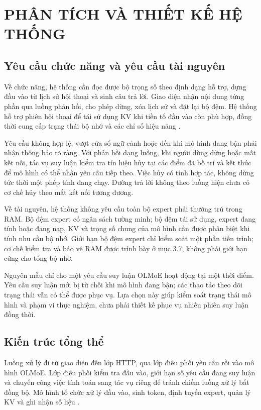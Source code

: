 \chapter{PHÂN TÍCH VÀ THIẾT KẾ HỆ THỐNG}


\section{Yêu cầu chức năng và yêu cầu tài nguyên}

Về chức năng, hệ thống cần đọc được bộ trọng số theo định dạng hỗ trợ, dựng đầu vào từ lịch sử hội thoại và sinh câu trả lời. Giao diện nhận nội dung từng phần qua luồng phản hồi, cho phép dừng, xóa lịch sử và đặt lại bộ đệm. Hệ thống hỗ trợ phiên hội thoại để tái sử dụng KV khi tiền tố đầu vào còn phù hợp, đồng thời cung cấp trạng thái bộ nhớ và các chỉ số hiệu năng \cite{moe_tierengine_arch}.

Yêu cầu không hợp lệ, vượt cửa sổ ngữ cảnh hoặc đến khi mô hình đang bận phải nhận thông báo rõ ràng. Với phản hồi dạng luồng, khi người dùng dừng hoặc mất kết nối, tác vụ suy luận kiểm tra tín hiệu hủy tại các điểm đã bố trí và kết thúc để mô hình có thể nhận yêu cầu tiếp theo. Việc hủy có tính hợp tác, không dừng tức thời một phép tính đang chạy. Đường trả lời không theo luồng hiện chưa có cơ chế hủy theo mất kết nối tương đương.

Về tài nguyên, hệ thống không yêu cầu toàn bộ expert phải thường trú trong RAM. Bộ đệm expert có ngân sách tường minh; bộ đệm tái sử dụng, expert đang tính hoặc đang nạp, KV và trọng số chung của mô hình cần được phân biệt khi tính nhu cầu bộ nhớ. Giới hạn bộ đệm expert chỉ kiểm soát một phần tiến trình; cơ chế kiểm tra và bảo vệ RAM được trình bày ở mục 3.7, không phải giới hạn cứng cho tổng bộ nhớ.

Nguyên mẫu chỉ cho một yêu cầu suy luận OLMoE hoạt động tại một thời điểm. Yêu cầu suy luận mới bị từ chối khi mô hình đang bận; các thao tác theo dõi trạng thái vẫn có thể được phục vụ. Lựa chọn này giúp kiểm soát trạng thái mô hình và phạm vi thực nghiệm, chưa phải thiết kế phục vụ nhiều phiên suy luận đồng thời.

\section{Kiến trúc tổng thể}

Luồng xử lý đi từ giao diện đến lớp HTTP, qua lớp điều phối yêu cầu rồi vào mô hình OLMoE. Lớp điều phối kiểm tra đầu vào, giới hạn số yêu cầu đang suy luận và chuyển công việc tính toán sang tác vụ riêng để tránh chiếm luồng xử lý bất đồng bộ. Mô hình tổ chức xử lý đầu vào, sinh token, định tuyến expert, quản lý KV và ghi nhận số liệu \cite{moe_tierengine_arch}.

